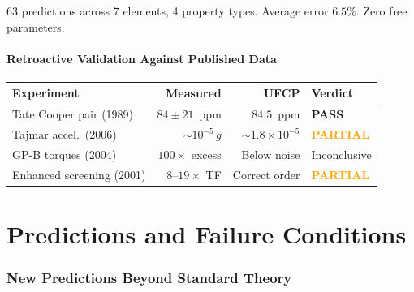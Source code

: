 \documentclass[11pt, a4paper]{article}
\newcommand{\pass}{\textcolor{nm-green}{\textbf{PASS}}}
\newcommand{\parti}{\textcolor{orange}{\textbf{PARTIAL}}}
\begin{document}
63 predictions across 7 elements, 4 property types. Average error
$6.5\%$. Zero free parameters.

\subsection{Retroactive Validation Against Published Data}

\begin{center}
\begin{tabular}{@{}lrrl@{}}
\toprule
\textbf{Experiment} & \textbf{Measured} & \textbf{UFCP} &
\textbf{Verdict} \\
\midrule
Tate Cooper pair (1989) & $84 \pm 21$~ppm & $84.5$~ppm & \pass \\
Tajmar accel.\ (2006) & $\sim 10^{-5}\,g$ & $\sim 1.8 \times 10^{-5}$ & \parti \\
GP-B torques (2004) & $100\times$ excess & Below noise & Inconclusive \\
Enhanced screening (2001) & $8$--$19\times$ TF & Correct order & \parti \\
\bottomrule
\end{tabular}
\end{center}

\newpage

\part{Predictions and Failure Conditions}

\section{New Predictions Beyond Standard Theory}
\end{document}
